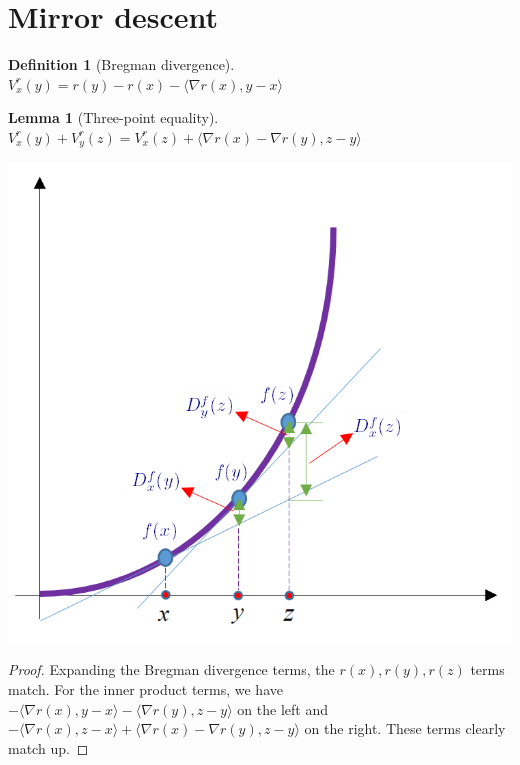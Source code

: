 \documentclass{article}
\newtheorem{lemma}[theorem]{Lemma}
\newtheorem{definition}[theorem]{Definition}
\begin{document}
\section{Mirror descent}

\begin{definition}[Bregman divergence]
$V_x^r(y) = r(y) - r(x) - \langle\nabla r(x), y-x\rangle$
\end{definition}

\begin{lemma}[Three-point equality]
$V_x^r(y) + V_y^r(z) = V_x^r(z) + \langle\nabla r(x)-\nabla r(y), z-y\rangle$
\end{lemma}
\includegraphics[scale=.5]{three-point.png}
\begin{proof}
Expanding the Bregman divergence terms, the $r(x),r(y),r(z)$ terms match. For the inner product terms, we have $-\langle\nabla r(x),y-x\rangle-\langle\nabla r(y),z-y\rangle$ on the left and $-\langle\nabla r(x),z-x\rangle + \langle\nabla r(x)-\nabla r(y),z-y\rangle$ on the right. These terms clearly match up.
\end{proof}
\end{document}
